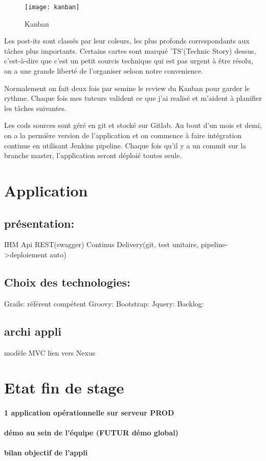 \begin{figure}[h]
\centering
\texttt{[image: kanban]}
\caption{Kanban}
\label{fig:kanban}
\end{figure}

Les post-its sont classés par leur coleurs, les plus profonds correspondants aux tâches plus importants. Certains cartes sont marqué 'TS'(Technic Story) dessus, c'est-à-dire que c'est un petit sourcis technique qui est pas urgent à être résolu, on a une grande liberté de l'organiser seloon notre convenience.

Normalement on fait  deux fois par semine le review du Kanban pour garder le rythme. Chaque fois mes tuteurs valident ce que j'ai realisé et m'aident à planifier les tâches suivantes.

Les cods sources sont géré en git et stocké sur Gitlab. Au bout d'un mois et demi, on a la permière version de l'application et on commence à faire intégration continue en utilisant Jenkins pipeline. Chaque fois qu'il y a un commit sur la branche master, l'application seront déploié toutes seule.

\clearpage

\section{Application}
\subsection{présentation:}
IHM
Api REST(swagger)
Continus Delivery(git, test unitaire, pipeline->deploiement auto)

\subsection{Choix des technologies:}
Grails: référent compétent
Groovy:
Bootstrap:
Jquery:
Backlog:

\subsection{archi appli}
modèle MVC
lien vers Nexus

\clearpage

\section{Etat fin de stage}
\paragraph{1 application opérationnelle sur serveur PROD}
\paragraph{démo au sein de l’équipe (FUTUR démo global)}
\paragraph{bilan objectif de l’appli}

\clearpage
